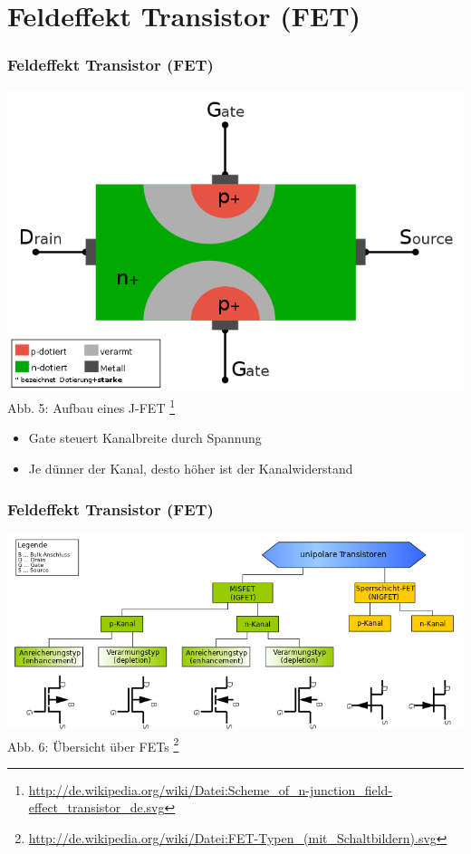 \section*{Feldeffekt Transistor (FET)}
\begin{frame}
\frametitle{Feldeffekt Transistor (FET)}
\begin{center}
	\includegraphics[scale=0.2]{e13/FET-aufbau.png}\\
	Abb. 5: Aufbau eines J-FET
	\footnote{\url{http://de.wikipedia.org/wiki/Datei:Scheme_of_n-junction_field-effect_transistor_de.svg}}\\
	
\begin{itemize}
	\item Gate steuert Kanalbreite durch Spannung
	\item Je dünner der Kanal, desto höher ist der Kanalwiderstand
\end{itemize}
\end{center}
\end{frame}

\begin{frame}
\frametitle{Feldeffekt Transistor (FET)}
\begin{center}
	\includegraphics[scale=0.35]{e13/FET-overview.png}\\
	Abb. 6: Übersicht über FETs
	\footnote{\url{http://de.wikipedia.org/wiki/Datei:FET-Typen_(mit_Schaltbildern).svg}}\\
\end{center}
\end{frame}

